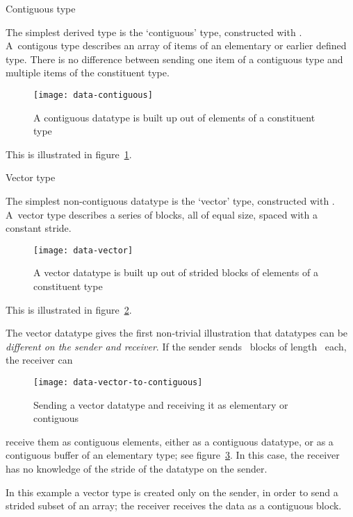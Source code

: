  {Contiguous type}
\label{sec:data:contiguous}

The simplest derived type is the `contiguous' type,
constructed with .
%
%
A~contigous type describes an array of items
of an elementary or earlier defined type. There is no difference between sending
one item of a contiguous type and multiple items of the constituent type.
\begin{figure}[ht]
  \texttt{[image: data-contiguous]}
  \caption{A contiguous datatype is built up out of elements of a constituent type}
  \label{fig:data-contiguous}
\end{figure}
This is illustrated in figure~\ref{fig:data-contiguous}.


 {Vector type}
\label{sec:data:vector}

The simplest non-contiguous datatype is the `vector' type, constructed with
.
%
%
A~vector type describes a series of blocks, all 
of equal size, spaced with a constant stride.
\begin{figure}[ht]
  \texttt{[image: data-vector]}
  \caption{A vector datatype is built up out of strided blocks of elements of a constituent type}
  \label{fig:data-vector}
\end{figure}
This is illustrated in figure~\ref{fig:data-vector}.

The vector datatype gives the first non-trivial illustration that
datatypes can be \emph{different on the sender and
  receiver}. If the
sender sends ~blocks of length~ each, the receiver can
%
\begin{figure}
  \texttt{[image: data-vector-to-contiguous]}
  \caption{Sending a vector datatype and receiving it as elementary or
    contiguous}
  \label{fig:data-vector-to-contiguous}
\end{figure}
%
receive them as  contiguous elements, either as a contiguous
datatype, or as a contiguous buffer of an elementary type; see
figure~\ref{fig:data-vector-to-contiguous}. In this case, the receiver
has no knowledge of the stride of the datatype on the sender.

In this example a vector type is created only on the sender, in order to send
a strided subset of an array; the receiver receives the data as a contiguous block.

